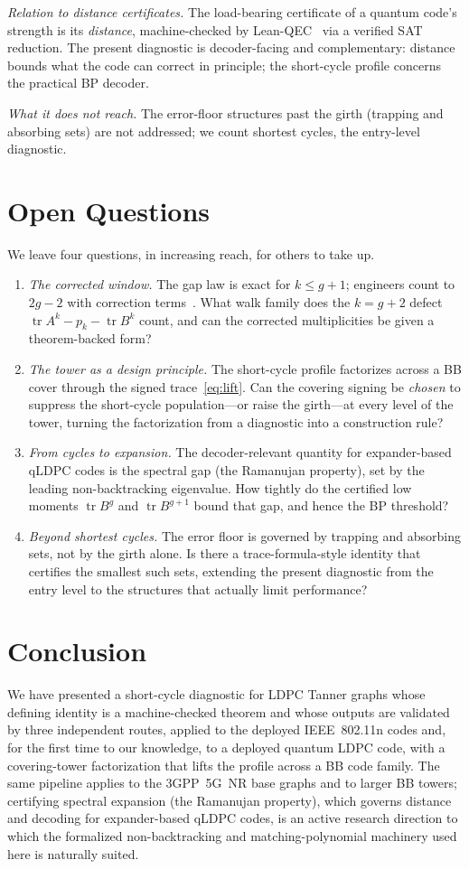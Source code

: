 \documentclass[journal]{IEEEtran}
\DeclareMathOperator{\tr}{tr}
\begin{document}
\emph{Relation to distance certificates.} The load-bearing certificate of a quantum code's
strength is its \emph{distance}, machine-checked by Lean-QEC~\cite{LeanQEC} via a verified SAT
reduction. The present diagnostic is decoder-facing and complementary: distance bounds what the
code can correct in principle; the short-cycle profile concerns the practical BP decoder.

\emph{What it does not reach.} The error-floor structures past the girth (trapping and
absorbing sets) are not addressed; we count shortest cycles, the entry-level diagnostic.

\section{Open Questions}
\label{sec:open}
We leave four questions, in increasing reach, for others to take up.
\begin{enumerate}
\item \emph{The corrected window.} The gap law is exact for $k\le g+1$; engineers count to
$2g-2$ with correction terms~\cite{Blake}. What walk family does the $k=g+2$ defect
$\tr A^k-p_k-\tr B^k$ count, and can the corrected multiplicities be given a theorem-backed
form?
\item \emph{The tower as a design principle.} The short-cycle profile factorizes across a BB
cover through the signed trace~\eqref{eq:lift}. Can the covering signing be \emph{chosen} to
suppress the short-cycle population---or raise the girth---at every level of the tower, turning
the factorization from a diagnostic into a construction rule?
\item \emph{From cycles to expansion.} The decoder-relevant quantity for expander-based qLDPC
codes is the spectral gap (the Ramanujan property), set by the leading non-backtracking
eigenvalue. How tightly do the certified low moments $\tr B^g$ and $\tr B^{g+1}$ bound that
gap, and hence the BP threshold?
\item \emph{Beyond shortest cycles.} The error floor is governed by trapping and absorbing
sets, not by the girth alone. Is there a trace-formula-style identity that certifies the
smallest such sets, extending the present diagnostic from the entry level to the structures
that actually limit performance?
\end{enumerate}

\section{Conclusion}
We have presented a short-cycle diagnostic for LDPC Tanner graphs whose defining identity is a
machine-checked theorem and whose outputs are validated by three independent routes, applied to
the deployed IEEE~802.11n codes and, for the first time to our knowledge, to a deployed quantum LDPC code, with a
covering-tower factorization that lifts the profile across a BB code family. The same pipeline
applies to the 3GPP~5G~NR base graphs and to larger BB towers; certifying spectral expansion
(the Ramanujan property), which governs distance and decoding for expander-based qLDPC codes, is
an active research direction to which the formalized non-backtracking and matching-polynomial
machinery used here is naturally suited.
\end{document}
